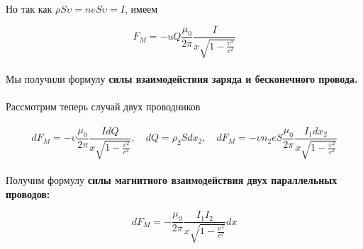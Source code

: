 \documentclass[dvipdfmx]{article}
\begin{document}
Но так как $\rho S\upsilon = neS\upsilon = I$, имеем

\begin{equation*}
  F_M = -uQ\frac{\mu_0}{2\pi}\frac{I}{x\sqrt{1-\frac{\upsilon^2}{c^2}}}
\end{equation*}
\paragraph{}

Мы получили формулу \textbf{силы взаимодействия заряда и бесконечного провода.}

\paragraph{}

Рассмотрим теперь случай двух проводников

\noindent{}
\paragraph{}

\begin{equation*}
  dF_M = -\upsilon\frac{\mu_0}{2\pi} \frac{IdQ}{x\sqrt{1-\frac{\upsilon^2}{c^2}}}, \quad dQ = \rho_2Sdx_2,
  \quad dF_M = -\upsilon n_2eS\frac{\mu_0}{2\pi} \frac{I_1dx_2}{x\sqrt{1-\frac{\upsilon^2}{c^2}}}
\end{equation*}
\paragraph{}

Получим формулу \textbf{силы магнитного взаимодействия двух параллельных проводов:}

\begin{equation*}
  dF_M = -\frac{\mu_0}{2\pi} \frac{I_1I_2}{x\sqrt{1-\frac{\upsilon^2}{c^2}}} dx
\end{equation*}
\end{document}
